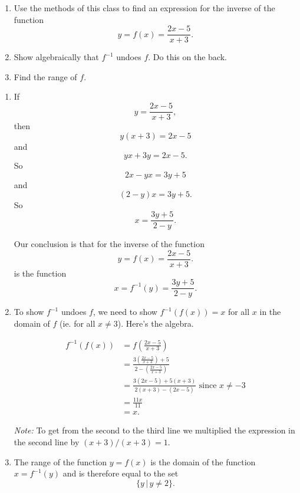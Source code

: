 \documentclass{ximera}
\begin{document}
\begin{question} \label{Q49v93f3}
\begin{enumerate}

\item[(a)] Use the methods of this class to find an expression for the inverse of the function
\[
    y = f(x) = \frac{2x-5}{x+3}.
\]

\item[(b)] Show algebraically that $f^{-1}$ undoes $f$. Do this on the back.

\item[(c)] Find the range of $f$.

\end{enumerate}

\begin{explanation}
\begin{enumerate}
\item If 
\[
 y = \frac{2x-5}{x+3} ,
\]
then
\[
 y(x+3) = 2x - 5
\]
and
\[
  yx + 3y = 2x - 5.
\]
So
\[
 2x - yx = 3y + 5
\]
and
\[
  (2-y)x = 3y + 5.
\]
So
\[
 x = \frac{3y+5}{2-y}.
\]

Our conclusion is that  for the inverse of the function
\[
    y = f(x) = \frac{2x-5}{x+3}.
\]
is the function
\[
x = f^{-1}(y) = \frac{3y+5}{2-y}.
\]

\item To show $f^{-1}$ undoes $f$, we need to show $f^{-1}(f(x)) = x$ for all $x$ in the domain of $f$ (ie. for all $x\neq 3$). Here's the algebra.

\begin{align*}
  f^{-1}(f(x))  &= f \left( \frac{2x-5}{x+3} \right) \\
                     & = \frac{3 \left( \frac{2x-5}{x+3}\right) + 5 }{2 - \left(  \frac{2x-5}{x+3} \right)} \\
                     &= \frac{3(2x-5) + 5(x+3)}{2(x+3) - (2x-5)} \text{ since } x \neq -3 \\
                     &= \frac{11x}{11}\\
                     &=x .
\end{align*}

\emph{Note:} To get from the second to the third line we multiplied the expression in the second line by  $(x+3)/(x+3) = 1$.

\item The range of the function $y=f(x)$ is the domain of the function $x=f^{-1}(y)$ and is therefore equal to the set
\[
  \{  y \, | \, y \neq 2 \}.
\]

\end{enumerate}
\end{explanation}
\end{question}
\end{document}
